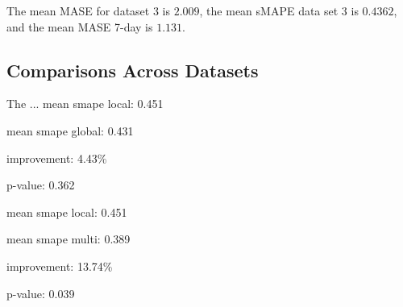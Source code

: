 The mean MASE for dataset 3 is $2.009$,
the mean sMAPE data set 3 is $0.4362$,
and the mean MASE 7-day is $1.131$.






\subsection{Comparisons Across Datasets}
The ...
mean smape local: 0.451

mean smape global: 0.431

improvement: 4.43\%

p-value: 0.362

mean smape local: 0.451

mean smape multi: 0.389

improvement: 13.74\%

p-value: 0.039

